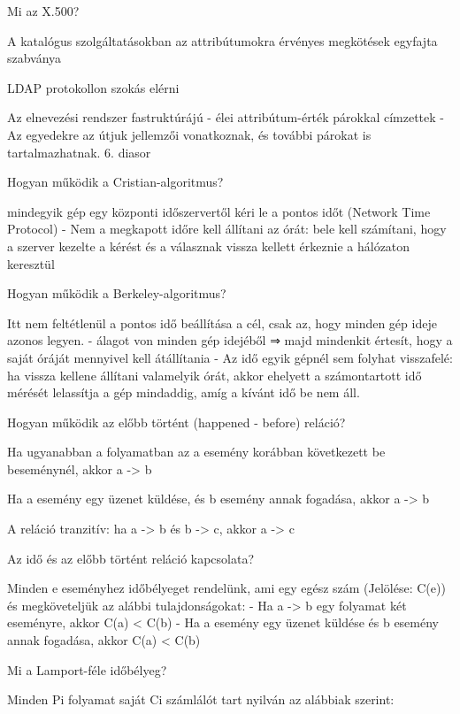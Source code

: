 \documentclass[twoside, a4paper, 12pt]{article}
\begin{document}
\begin{description}
        \item  Mi az X.500?
        \item A katalógus szolgáltatásokban az attribútumokra érvényes megkötések egyfajta szabványa
        \item LDAP protokollon szokás elérni 
        \item Az elnevezési rendszer fastruktúrájú
            - élei attribútum-érték párokkal címzettek
            - Az egyedekre az útjuk jellemzői vonatkoznak, és további párokat is tartalmazhatnak.
            6. diasor
        \item  Hogyan működik a Cristian-algoritmus?
        \item mindegyik gép egy központi időszervertől kéri le a pontos időt (Network Time Protocol)	
            - Nem a megkapott időre kell állítani az órát: bele kell számítani, hogy 
            a szerver kezelte a kérést és a válasznak vissza kellett érkeznie a hálózaton keresztül
        \item  Hogyan működik a Berkeley-algoritmus?
        \item Itt nem feltétlenül a pontos idő beállítása a cél, csak az, hogy minden gép ideje azonos legyen.
            - álagot von minden gép idejéből
            ⇒ majd mindenkit értesít, hogy a saját óráját mennyivel kell átállítania
            - Az idő egyik gépnél sem folyhat visszafelé: ha vissza kellene állítani valamelyik órát,
            akkor ehelyett a számontartott idő mérését lelassítja a gép mindaddig, amíg a kívánt idő be nem áll.
        \item  Hogyan működik az előbb történt (happened - before) reláció?
        \item Ha ugyanabban a folyamatban az a esemény korábban következett be beseménynél, akkor a -> b
        \item Ha a esemény egy üzenet küldése, és b esemény annak fogadása, akkor a -> b
        \item A reláció tranzitív:  ha a -> b és b -> c, akkor a -> c
        \item  Az idő és az előbb történt reláció kapcsolata?
        \item Minden e eseményhez időbélyeget rendelünk, ami egy egész szám (Jelölése:  C(e)) és megköveteljük az alábbi tulajdonságokat:
            - Ha a -> b egy folyamat két eseményre, akkor C(a) < C(b)
            - Ha a esemény egy üzenet küldése és b esemény annak fogadása, akkor C(a) < C(b)
        \item  Mi a Lamport-féle időbélyeg?
        \item Minden Pi folyamat saját Ci számlálót tart nyilván az alábbiak szerint: 

\end{description}
\end{document}
